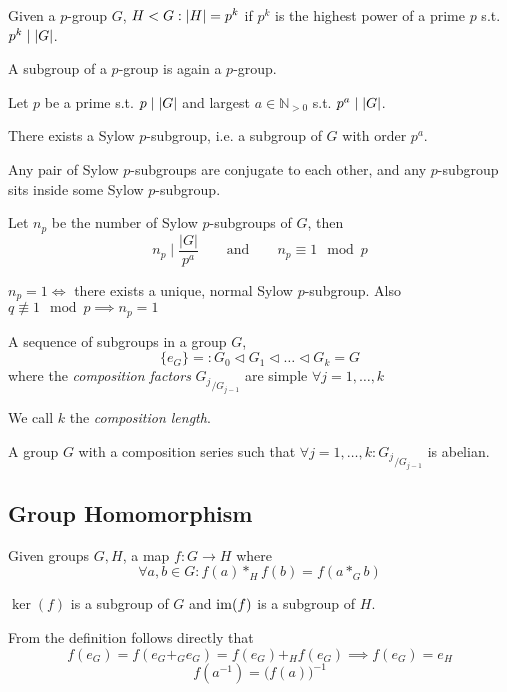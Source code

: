 \begin{definition}
   Given a \(p\)-group \(G\), \(H < G: \left\lvert H\right\rvert = p^k\) if \(p^k\) is the highest power of a prime \(p\) s.t. \(p^k \mid \left\lvert G\right\rvert\).
\end{definition}
\begin{remark}
   A subgroup of a \(p\)-group is again a \(p\)-group.
\end{remark}
Let \(p\) be a prime s.t. \(p \mid \left\lvert G\right\rvert\) and largest \(a \in \mathbb{N}_{>0}\) s.t. \(p^a \mid \left\lvert G\right\rvert\).
\begin{theorem}
   There exists a Sylow \(p\)-subgroup, i.e. a subgroup of \(G\) with order \(p^a\).
\end{theorem}
\begin{theorem}
   Any pair of Sylow \(p\)-subgroups are conjugate to each other, and any \(p\)-subgroup sits inside some Sylow \(p\)-subgroup.
\end{theorem}
\begin{theorem}
   Let \(n_p\) be the number of Sylow \(p\)-subgroups of \(G\), then
   \[n_p \mid \frac{|G|}{p^a} \qquad\text{and}\qquad n_p \equiv 1 \mod p\]
\end{theorem}
\begin{remark}
   \(n_p = 1 \iff\) there exists a unique, normal Sylow \(p\)-subgroup.
   Also \(q \not\equiv 1 \mod p \implies n_p = 1\)
\end{remark}

\begin{definition}
   A sequence of subgroups in a group \(G\),
   \[\{e_G\} =: G_0 \triangleleft G_1 \triangleleft \ldots \triangleleft G_k = G\]
   where the \emph{composition factors} \({G_j}_{/G_{j-1}}\) are simple \(\forall j = 1, \ldots, k\)
\end{definition}
\begin{remark}
   We call \(k\) the \emph{composition length}.
\end{remark}

\begin{definition}
   A group \(G\) with a composition series such that \(\forall j = 1, \ldots, k: {G_j}_{/G_{j-1}}\) is abelian.
\end{definition}

\subsection{Group Homomorphism}
\begin{definition}
   Given groups \(G, H\), a map \(f: G \to H\) where
   \[\forall a, b \in G: f(a) \ast_H f(b) = f(a \ast_G b)\]
\end{definition}
\begin{remark}
   \(\ker(f)\) is a subgroup of \(G\) and \(\operatorname{im}(f)\) is a subgroup of \(H\).
\end{remark}
\begin{remark}
   From the definition follows directly that
   \[f(e_G) = f(e_G +_G e_G) = f(e_G) +_H f(e_G) \implies f(e_G) = e_H\]
   \[f(a^{-1}) = \big(f(a)\big)^{-1}\]
\end{remark}

